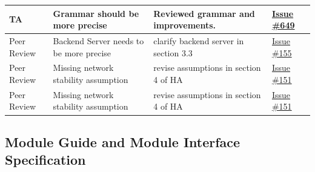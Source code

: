 \documentclass{article}
\begin{document}
\begin{longtable}{|p{2cm}|p{3.5cm}|p{4.5cm}|p{3cm}|}
TA & Grammar should be more precise & Reviewed grammar and improvements. & \href{https://github.com/4G06-CAPSTONE-2025/Reading4All/issues/649}{Issue \#649} \\
\hline
Peer Review & Backend Server needs to be more precise & clarify backend server in section 3.3 & \href{https://github.com/4G06-CAPSTONE-2025/Reading4All/issues/155}{Issue \#155} \\
\hline
Peer Review & Missing network stability assumption & revise assumptions in section 4 of HA & \href{https://github.com/4G06-CAPSTONE-2025/Reading4All/issues/151}{Issue \#151} \\
\hline
Peer Review & Missing network stability assumption & revise assumptions in section 4 of HA & \href{https://github.com/4G06-CAPSTONE-2025/Reading4All/issues/151}{Issue \#151} \\
\hline
\end{longtable}

\subsection{Module Guide and Module Interface Specification}
\end{document}
